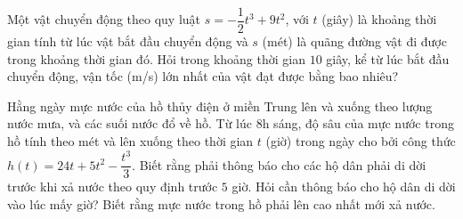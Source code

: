 \begin{bt}%

	Một vật chuyển động theo quy luật $s=-\dfrac12t^3+9t^2$, với $t$ (giây) là khoảng thời gian tính từ lúc vật bắt đầu chuyển động và $s$ (mét) là quãng đường vật đi được trong khoảng thời gian đó. Hỏi trong khoảng thời gian $10$ giây, kể từ lúc bắt đầu chuyển động, vận tốc (m/s) lớn nhất của vật đạt được bằng bao nhiêu?
	
\end{bt}

\begin{bt}%

	Hằng ngày mực nước của hồ thủy điện ở miền Trung lên và xuống theo lượng nước mưa, và các suối nước đổ về hồ. Từ lúc $8$h sáng, độ sâu của mực nước trong hồ tính theo mét và lên xuống theo thời gian $t$ (giờ) trong ngày cho bởi công thức $h(t)=24t+5t^2-\dfrac{t^3}{3}$. Biết rằng phải thông báo cho các hộ dân phải di dời trước khi xả nước theo quy định trước $5$ giờ. Hỏi cần thông báo cho hộ dân di dời vào lúc mấy giờ? Biết rằng mực nước trong hồ phải lên cao nhất mới xả nước.
\end{bt}

